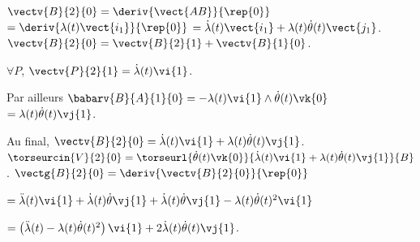 \begin{corrigebox}
$\vectv{B}{2}{0} = \deriv{\vect{AB}}{\rep{0}}$ $=\deriv{\lambda(t)\vect{i_1}}{\rep{0}}$
$=\dot{\lambda}(t)\vect{i_1}+\lambda(t)\dot{\theta}(t)\vect{j_1}$.
$\vectv{B}{2}{0}=\vectv{B}{2}{1}+\vectv{B}{1}{0}$.

$\forall P$, $\vectv{P}{2}{1}=\dot{\lambda}(t)\vi{1}$.

Par ailleurs $\babarv{B}{A}{1}{0}=-\lambda(t)\vi{1}\wedge\dot{\theta}(t)\vk{0}$
$=\lambda(t)\dot{\theta}(t)\vj{1}$.

Au final, $\vectv{B}{2}{0}=\dot{\lambda}(t)\vi{1}+\lambda(t)\dot{\theta}(t)\vj{1}$.
$\torseurcin{V}{2}{0} = \torseurl{\dot{\theta}(t)\vk{0}}{\dot{\lambda}(t)\vi{1}+\lambda(t)\dot{\theta}(t)\vj{1}}{B}$.
$\vectg{B}{2}{0} = \deriv{\vectv{B}{2}{0}}{\rep{0}}$

$ = \ddot{\lambda}(t)\vi{1}+  \dot{\lambda}(t)\dot{\theta}\vj{1}+\dot{\lambda}(t)\dot{\theta}\vj{1}-\lambda(t)\dot{\theta}(t)^2\vi{1}$

$ = \left( \ddot{\lambda}(t)-\lambda(t)\dot{\theta}(t)^2\right)\vi{1}  +  2 \dot{\lambda}(t)\dot{\theta}(t) \vj{1}$.
\end{corrigebox}
